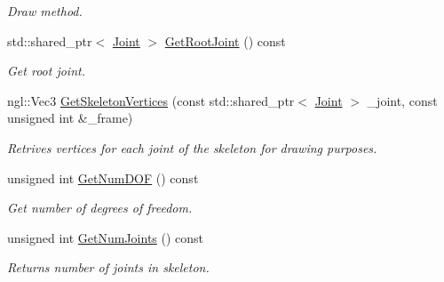 \begin{DoxyCompactItemize}
\begin{DoxyCompactList}\small\item\em Draw method. \end{DoxyCompactList}\item 
std\+::shared\+\_\+ptr$<$ \hyperlink{struct_joint}{Joint} $>$ \hyperlink{class_skeleton_a6c730a39dbc19aa10218dcbd2c551d78}{Get\+Root\+Joint} () const
\begin{DoxyCompactList}\small\item\em Get root joint. \end{DoxyCompactList}\item 
ngl\+::\+Vec3 \hyperlink{class_skeleton_a9e0c1df8b4a419f3a482dda48c66499c}{Get\+Skeleton\+Vertices} (const std\+::shared\+\_\+ptr$<$ \hyperlink{struct_joint}{Joint} $>$ \+\_\+joint, const unsigned int \&\+\_\+frame)
\begin{DoxyCompactList}\small\item\em Retrives vertices for each joint of the skeleton for drawing purposes. \end{DoxyCompactList}\item 
unsigned int \hyperlink{class_skeleton_a1c5de922c9e3bed948854d7b2ec529c8}{Get\+Num\+D\+OF} () const
\begin{DoxyCompactList}\small\item\em Get number of degrees of freedom. \end{DoxyCompactList}\item 
unsigned int \hyperlink{class_skeleton_a309b630523f58624f8ee9e394bc75b54}{Get\+Num\+Joints} () const
\begin{DoxyCompactList}\small\item\em Returns number of joints in skeleton. \end{DoxyCompactList}\end{DoxyCompactItemize}
